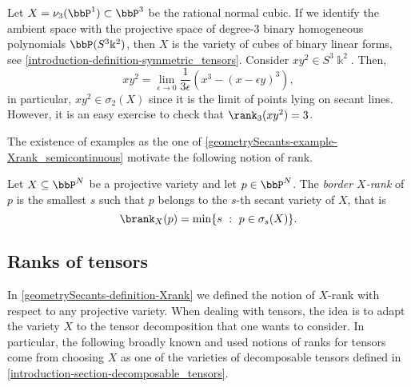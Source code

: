  \begin{example}
   \label{geometrySecants-example-Xrank_semicontinuous}
   Let $X = \nu_3(\bbP^1) \subset \bbP^3$ be the rational normal cubic. If we identify the ambient space with the projective space of degree-$3$ binary homogeneous polynomials $\bbP(S^3\Bbbk^2)$, then $X$ is the variety of cubes of binary linear forms, see \ref{introduction-definition-symmetric_tensors}. Consider $xy^2 \in S^3\Bbbk^2$. Then, 
   \[
      xy^2 = \lim_{\epsilon \to 0} \frac{1}{3\epsilon}\left( x^3 - (x-\epsilon y)^3\right),
 \]
  in particular, $xy^2 \in \sigma_2(X)$ since it is the limit of points lying on secant lines. However, it is an easy exercise to check that $\rank_3(xy^2) = 3$. 
 \end{example}
 
 The existence of examples as the one of \ref{geometrySecants-example-Xrank_semicontinuous} motivate the following notion of rank.

 \begin{definition}
     \label{geometrySecants-definition-border_rank}
     Let $X \subseteq \bbP^N$ be a projective variety and let $p \in \bbP^N$. The \emph{border $X$-rank} of $p$ is the smallest $s$ such that $p$ belongs to the $s$-th secant variety of $X$, that is 
     \[
         \brank_X(p) = \min\{s ~:~ p \in \sigma_s(X)\}.
     \]
 \end{definition}
 
 
 \subsection{Ranks of tensors}
 \label{geometrySecants-subsection-ranks}
 In \ref{geometrySecants-definition-Xrank} we defined the notion of $X$-rank with respect to any projective variety. When dealing with tensors, the idea is to adapt the variety $X$ to the tensor decomposition that one wants to consider. In particular, the following broadly known and used notions of ranks for tensors come from choosing $X$ as one of the varieties of decomposable tensors defined in \ref{introduction-section-decomposable_tensors}.
 
